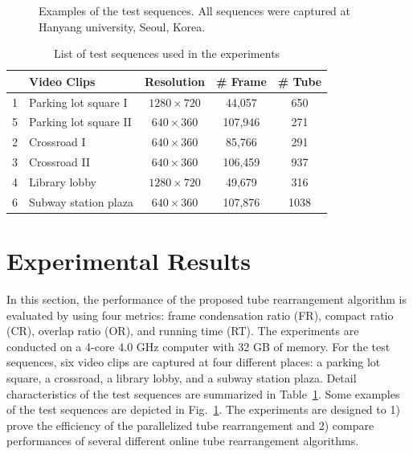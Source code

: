 \documentclass[11pt]{hyu_thesis}
\begin{document}
\begin{figure}
	\label{fig:parking_lot}
	\label{fig:subway_entrance}
	\caption{Examples of the test sequences. All sequences were captured at Hanyang university, Seoul, Korea.}
	\label{fig:examples}
\end{figure}
\begin{table}
	\small
	\begin{center}
		\begin{tabular}{c|l|c|c|c|}
			\cline{2-5}
			& Video Clips & Resolution & \# Frame & \# Tube\\
			\hline
			\multicolumn{1}{|c|}{1} & Parking lot square I & $1280 \times 720$ & 44,057 & 650\\
			\hline
			\multicolumn{1}{|c|}{5} & Parking lot square II & $640 \times 360$ & 107,946 & 271\\
			\hline
			\multicolumn{1}{|c|}{2} & Crossroad I & $640 \times 360$ & 85,766 & 291\\
			\hline
			\multicolumn{1}{|c|}{3} & Crossroad II & $640 \times 360$ & 106,459 & 937\\
			\hline
			\multicolumn{1}{|c|}{4} & Library lobby & $1280 \times 720$ & 49,679 & 316\\
			\hline
			\multicolumn{1}{|c|}{6} & Subway station plaza & $640 \times 360$ & 107,876 & 1038\\
			\hline
		\end{tabular}
	\end{center}
	\caption{List of test sequences used in the experiments}
	\label{tb:video_list}
\end{table}
\section{Experimental Results}
\label{sec:exp}
In this section, the performance of the proposed tube rearrangement algorithm is evaluated by using four metrics: frame condensation ratio (FR), compact ratio (CR), overlap ratio (OR), and running time (RT). The experiments are conducted on a 4-core 4.0 GHz computer with 32 GB of memory. For the test sequences, six video clips are captured at four different places: a parking lot square, a crossroad, a library lobby, and a subway station plaza. Detail characteristics of the test sequences are summarized in Table~\ref{tb:video_list}. Some examples of the test sequences are depicted in Fig.~\ref{fig:examples}. The experiments are designed to 1) prove the efficiency of the parallelized tube rearrangement and 2) compare performances of several different online tube rearrangement algorithms.
\end{document}
